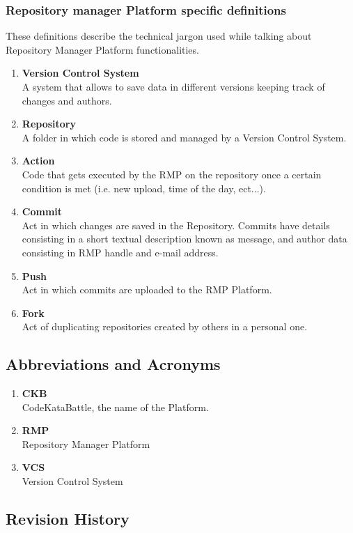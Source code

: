 \subsubsection[short]{Repository manager Platform specific definitions}
These definitions describe the technical jargon used while talking about Repository Manager Platform functionalities.
\begin{enumerate}[label=$\bullet$]
    \item \textbf{Version Control System}\\A system that allows to save data in different versions keeping track of changes and authors.
    \item \textbf{Repository}\\A folder in which code is stored and managed by a Version Control System.
    \item \textbf{Action}\\Code that gets executed by the RMP on the repository once a certain condition is met (i.e. new upload, time of the day, ect...).
    \item \textbf{Commit}\\Act in which changes are saved in the Repository. Commits have details consisting in a short textual description known as message, and author data consisting in RMP handle and e-mail address.
    \item \textbf{Push}\\Act in which commits are uploaded to the RMP Platform.
    \item \textbf{Fork}\\Act of duplicating repositories created by others in a personal one.
\end{enumerate}
\subsection{Abbreviations and Acronyms}
\begin{enumerate}[label=$\bullet$]
    \item \textbf{CKB}\\CodeKataBattle, the name of the Platform.
    \item \textbf{RMP}\\Repository Manager Platform
    \item \textbf{VCS}\\Version Control System
\end{enumerate}

\subsection{Revision History}

